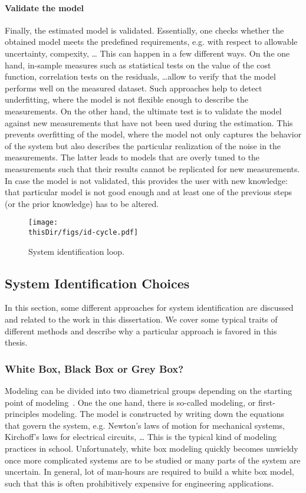 \paragraph{Validate the model}
Finally, the estimated model is validated.
Essentially, one checks whether the obtained model meets the predefined requirements, e.g. with respect to allowable uncertainty, compexity, \ldots
This can happen in a few different ways.
On the one hand, in-sample measures such as statistical tests on the value of the cost function, correlation tests on the residuals, \ldots allow to verify that the model performs well on the measured dataset.
Such approaches help to detect underfitting, where the model is not flexible enough to describe the measurements.
On the other hand, the ultimate test is to validate the model against new measurements that have not been used during the estimation.
This prevents overfitting of the model, where the model not only captures the behavior of the system but also describes the particular realization of the noise in the measurements.
The latter leads to models that are overly tuned to the measurements such that their results cannot be replicated for new measurements.
In case the model is not validated, this provides the user with new knowledge: that particular model is not good enough and at least one of the previous steps (or the prior knowledge) has to be altered.


\begin{figure}
  \centering
  \texttt{[image: \\thisDir/figs/id-cycle.pdf]}
  \caption[System identification loop]{System identification loop. }
  \label{fig:intro:identification-cycle}
\end{figure}

\subsection{System Identification Choices}
In this section, some different approaches for system identification are discussed and related to the work in this dissertation.
We cover some typical traits of different methods and describe why a particular approach is favored in this thesis.

\subsubsection{White Box, Black Box or Grey Box?}
Modeling can be divided into two diametrical groups depending on the starting point of modeling~\citep{Ljung2010}.
One the one hand, there is so-called  modeling, or first-principles modeling.
The model is constructed by writing down the equations that govern the system, e.g. Newton's laws of motion for mechanical systems, Kirchoff's laws for electrical circuits, \ldots
This is the typical kind of modeling practices in school.
Unfortunately, white box modeling quickly becomes unwieldy once more complicated systems are to be studied or many parts of the system are uncertain.
In general, lot of man-hours are required to build a white box model, such that this is often prohibitively expensive for engineering applications.


